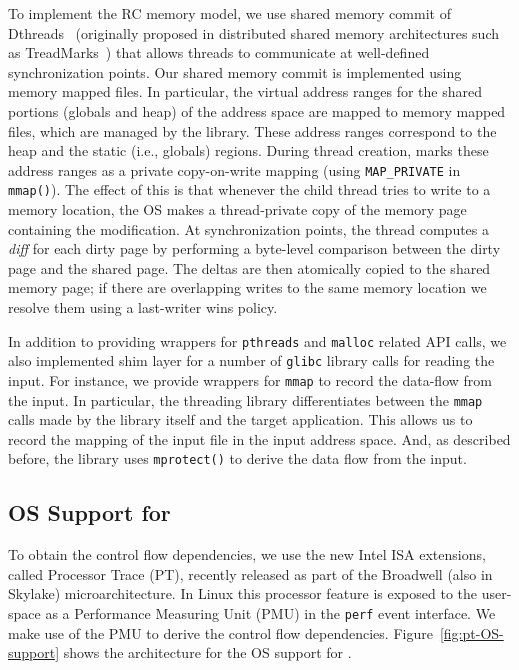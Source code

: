 To implement the RC memory model, we use shared memory commit of  Dthreads~\cite{dthreads-sosp-2011} (originally proposed in distributed shared memory architectures such as TreadMarks~\cite{treadmark})%
that allows threads to communicate at well-defined synchronization points.
Our shared memory commit is implemented using memory mapped files. In
particular, the virtual address ranges for the shared portions (globals and heap) of
the address space are mapped to memory mapped files, which are managed by the
\projecttitle library. These address ranges correspond to the heap and
the static (i.e., globals) regions.  During thread creation,
\projecttitle marks these address ranges as a private copy-on-write
mapping (using {\tt MAP\_PRIVATE} in {\tt mmap()}). The effect of this
is that whenever the child thread tries to write to a memory location,
the OS makes a thread-private copy of the memory page containing the
modification.  At synchronization points, the thread computes a {\em diff}
for each dirty page by performing a byte-level comparison between the
dirty page and the shared page. The deltas are then atomically
copied to the shared memory page; if there are overlapping writes
to the same memory location we resolve them using a last-writer wins policy.


 In addition to providing wrappers for {\tt pthreads} and {\tt malloc} related API calls, we also implemented shim layer for a number of {\tt glibc} library calls for reading the input. For instance, we provide wrappers for {\tt mmap} to record the data-flow from the input. In particular, the threading library differentiates between the {\tt mmap} calls made by the library itself and the target application. This allows us to record the mapping of the input file in the input address space. And, as described before, the library uses {\tt mprotect()} to derive the data flow from the input. 


\subsection{OS Support for \intelpt}

To obtain the control flow dependencies, we use the new Intel ISA extensions, called Processor Trace (PT), recently released as part of the Broadwell (also in Skylake) microarchitecture. In Linux this processor feature is exposed to the user-space as a Performance Measuring Unit (PMU) in the {\tt perf} event interface. We make use of the \intelpt PMU to derive the control flow dependencies. Figure~\ref{fig:pt-OS-support} shows the architecture for the OS support for \intelpt.

